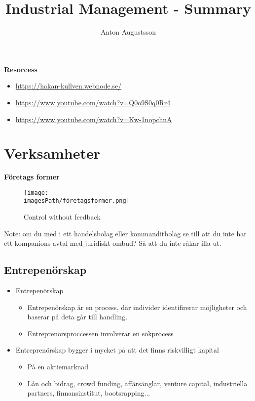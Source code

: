\documentclass{article}
\title{Industrial Management - Summary}
\author{Anton Augustsson}
\newcommand{\imagesPath}{images}
\begin{document}
\maketitle
\newpage
\tableofcontents
\newpage

\textbf{Resorcess}
\begin{itemize}
    \item \url{https://hakan-kullven.webnode.se/}
    \item \url{https://www.youtube.com/watch?v=Q0o9S0q0Rr4}
    \item \url{https://www.youtube.com/watch?v=Kw-1nopchnA}
\end{itemize}

\section{Verksamheter}
\textbf{Företags former}
\begin{figure}[!h]
    \centering
    \texttt{[image: \\imagesPath/företagsformer.png]}
    \caption{Control without feedback}
\end{figure}


Note: om du med i ett handelsbolag eller kommanditbolag se till att du inte
har ett kompanions avtal med juridiskt ombud? Så att du inte råkar illa ut.

\subsection{Entrepenörskap}
\begin{itemize}
    \item Entrepenörskap
    \begin{itemize}
        \item Entrepenörskap är en process, där individer identifirerar möjligheter och baserar på deta går till handling.
        \item Entreprenörsproccessen involverar en sökprocess
    \end{itemize}
    \item Entreprenörskap bygger i mycket på att det finns riskvilligt kapital
    \begin{itemize}
        \item På en aktiemarknad 
        \item Lån och bidrag, crowd funding, affärsänglar, venture capital, industriella partners, finnansinstitut, bootsrapping...
    \end{itemize}
\end{itemize}
\end{document}
